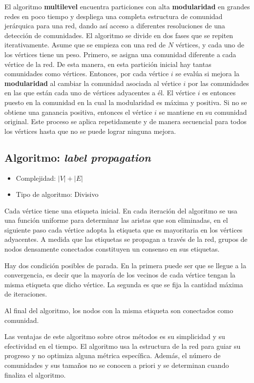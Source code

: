 El algoritmo \textbf{multilevel} encuentra particiones con alta \textbf{modularidad} en grandes redes en poco tiempo y despliega una completa estructura de comunidad jerárquica para una red, dando así acceso a diferentes resoluciones de una detección de comunidades. El algoritmo se divide en dos fases que se repiten iterativamente. Asume que se empieza con una red de $N$ vértices, y cada uno de los vértices tiene un peso. Primero, se asigna una comunidad diferente a cada vértice de la red. De esta manera, en esta partición inicial hay tantas comunidades como vértices. Entonces, por cada vértice $i$ se evalúa si mejora la \textbf{modularidad} al cambiar la comunidad asociada al vértice $i$ por las comunidades en las que están cada uno de vértices adyacentes a él. El vértice $i$ es entonces puesto en la comunidad en la cual la modularidad es máxima y positiva. Si no se obtiene una ganancia positiva, entonces el vértice $i$ se mantiene en su comunidad original. Este proceso se aplica repetidamente y de manera secuencial para todos los vértices hasta que no se puede lograr ninguna mejora.
 
\subsection{Algoritmo: \textit{label propagation}}\cite{Raghavan2007NearNetworks.}
\begin{itemize}
\item Complejidad: $|V| + |E|$
\item Tipo de algoritmo: Divisivo
\end{itemize}
Cada vértice tiene una etiqueta inicial. En cada iteración del algoritmo se usa una función uniforme para determinar las aristas que son eliminadas, en el siguiente paso cada vértice adopta la etiqueta que es mayoritaria en los vértices adyacentes. A medida que las etiquetas se propagan a través de la red, grupos de nodos densamente conectados constituyen un consenso en sus etiquetas. 

Hay dos condición posibles de parada. En la primera puede ser que se llegue a la convergencia, es decir que la mayoría de los vecinos de cada vértice tengan la misma etiqueta que dicho vértice. La segunda es que se fija la cantidad máxima de iteraciones. 

Al final del algoritmo, los nodos con la misma etiqueta son conectados como comunidad. 

Las ventajas de este algoritmo sobre otros métodos es su simplicidad y su efectividad en el tiempo. El algoritmo usa la estructura de la red para guiar su progreso y no optimiza alguna métrica específica. Además, el número de comunidades y sus tamaños no se conocen a priori y se determinan cuando finaliza el algoritmo.
 
